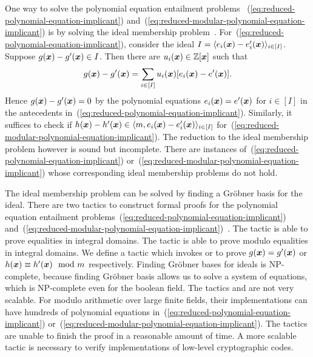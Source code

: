One way to solve the polynomial equation entailment problems
~(\ref{eq:reduced-polynomial-equation-implicant})
and~(\ref{eq:reduced-modular-polynomial-equation-implicant}) is by
solving the ideal membership problem~\cite{H:07:AENTP,BS:16:GFEV}. 
For~(\ref{eq:reduced-polynomial-equation-implicant}), consider the
ideal $I = \langle e_i(\vx) - e'_i(\vx) \rangle_{i \in [I]}$. Suppose
$g(\vx) - g'(\vx) \in I$. Then there are $u_i(\vx) \in \bbfZ[\vx]$
such that 
\[
g(\vx) - g'(\vx) = \sum\limits_{i \in [I]} u_i (\vx) [e_i (\vx) - e' (\vx)].
\]
Hence $g(\vx) - g'(\vx) = 0$ by the polynomial equations $e_i (\vx) =
e' (\vx)$ for $i \in [I]$ in the antecedents
in~(\ref{eq:reduced-polynomial-equation-implicant}). Similarly, it
suffices to check if $h(\vx) - h'(\vx) \in \langle m, e_i(\vx) -
e'_i(\vx) \rangle_{i \in [I]}$
for~(\ref{eq:reduced-modular-polynomial-equation-implicant}).
The reduction to the ideal membership problem however is sound but
incomplete. There are instances
of~(\ref{eq:reduced-polynomial-equation-implicant})
or~(\ref{eq:reduced-modular-polynomial-equation-implicant}) whose
corresponding ideal membership problems do not hold. 

The ideal membership problem can be solved by finding a Gr\"obner
basis for the ideal. There are two \coq tactics to
construct formal proofs for the polynomial equation entailment
problems~(\ref{eq:reduced-polynomial-equation-implicant})
and~(\ref{eq:reduced-modular-polynomial-equation-implicant})~\cite{P:08:CGBP,P:10:CGBP}. 
The tactic  is able to prove
equalities in integral domains. The tactic  is able
to prove modulo equalities in integral domains. We define a
\coq tactic which invokes  or  
to prove $g (\vx) = g' (\vx)$ or $h (\vx) \equiv
h' (\vx) \mod m$ respectively. Finding Gr\"obner bases for ideals is
%
NP-complete, because finding Gr\"obner basis allows us to
  solve a system of equations, which is NP-complete even for the
  boolean field.  
%
The tactics  and  are not very
scalable.
For modulo arithmetic over large finite fields, their 
implementations can have hundreds of polynomial equations
in~(\ref{eq:reduced-polynomial-equation-implicant})
or~(\ref{eq:reduced-modular-polynomial-equation-implicant}). 
The \coq tactics are unable to finish
the proof in a reasonable amount of time. A more scalable tactic is
necessary to verify implementations of low-level cryptographic codes.

